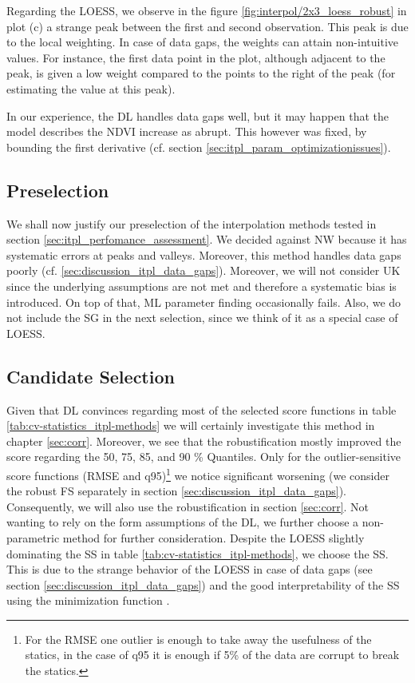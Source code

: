 {{        Regarding the LOESS, we observe in the figure \ref{fig:interpol/2x3_loess_robust} in plot (c) a strange peak between the first and second observation. This peak is due to the local weighting. In case of data gaps, the weights can attain non-intuitive values. For instance, the first data point in the plot, although adjacent to the peak, is given a low weight compared to the points to the right of the peak (for estimating the value at this peak).

        In our experience, the DL handles data gaps well, but it may happen that the model describes the NDVI increase as abrupt. This however was fixed, by bounding the first derivative (cf. section \ref{sec:itpl_param_optimizationissues}).
    }

    \subsection{Preselection}{\label{sec:itpl_preselection}
        We shall now justify our preselection of the interpolation methods tested in section \ref{sec:itpl_perfomance_assessment}. 
        We decided against NW because it has systematic errors at peaks and valleys. Moreover, this method handles data gaps poorly (cf. \ref{sec:discussion_itpl_data_gaps}). 
        Moreover, we will not consider UK since the underlying assumptions are not met and therefore a systematic bias is introduced. On top of that, ML parameter finding occasionally fails.
        Also, we do not include the SG in the next selection, since we think of it as a special case of LOESS.
    }

    \subsection{Candidate Selection}{
        Given that DL convinces regarding most of the selected score functions in table \ref{tab:cv-statistics_itpl-methods} we will certainly investigate this method in chapter \ref{sec:corr}. Moreover, we see that the robustification mostly improved the score regarding the 50, 75, 85, and 90 \% Quantiles. Only for the outlier-sensitive score functions (RMSE and q95)\footnote{For the RMSE one outlier is enough to take away the usefulness of the statics, in the case of q95 it is enough if 5\% of the data are corrupt to break the statics.} we notice significant worsening (we consider the robust FS separately in section \ref{sec:discussion_itpl_data_gaps}). Consequently, we will also use the robustification in section \ref{sec:corr}.
        Not wanting to rely on the form assumptions of the DL, we further choose a non-parametric method for further consideration. Despite the LOESS slightly dominating the SS in table \ref{tab:cv-statistics_itpl-methods}, we choose the SS. This is due to the strange behavior of the LOESS in case of data gaps (see section \ref{sec:discussion_itpl_data_gaps}) and the good interpretability of the SS using the minimization function .
    }


}

